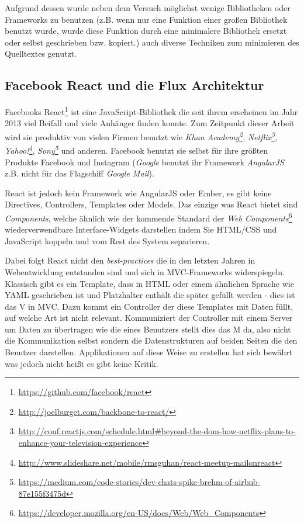 \documentclass[12pt,twoside]{book}
\begin{document}
Aufgrund dessen wurde neben dem Versuch möglichst wenige Bibliotheken oder Frameworks zu benutzen (z.B. wenn nur eine Funktion einer großen Bibliothek benutzt wurde, wurde diese Funktion durch eine minimalere Bibliothek ersetzt oder selbst geschrieben bzw. kopiert.) auch diverse Techniken zum minimieren des Quelltextes genutzt.



\subsection*{Facebook React und die Flux Architektur}

Facebooks React\footnote{\url{https://github.com/facebook/react}} ist eine JavaScript-Bibliothek die seit ihrem erscheinen im Jahr 2013 viel Beifall und viele Anhänger finden konnte. Zum Zeitpunkt dieser Arbeit wird sie produktiv von vielen Firmen benutzt wie \textit{Khan Academy\footnote{\url{http://joelburget.com/backbone-to-react/}}}, \textit{Netflix\footnote{\url{http://conf.reactjs.com/schedule.html\#beyond-the-dom-how-netflix-plans-to-enhance-your-television-experience}}}, \textit{Yahoo!\footnote{\url{http://www.slideshare.net/mobile/rmsguhan/react-meetup-mailonreact}}}, \textit{Sony\footnote{\url{https://medium.com/code-stories/dev-chats-spike-brehm-of-airbnb-87e155f3475d}}} und anderen. Facebook benutzt sie selbst für ihre größten Produkte Facebook und Instagram (\textit{Google} benutzt ihr Framework \textit{AngularJS} z.B. nicht für das Flagschiff \textit{Google Mail}).

React ist jedoch kein Framework wie AngularJS oder Ember, es gibt keine Directives, Controllers, Templates oder Models. Das einzige was React bietet sind \textit{Components}, welche ähnlich wie der kommende Standard der \textit{Web Components}\footnote{\url{https://developer.mozilla.org/en-US/docs/Web/Web_Components}} wiederverwendbare Interface-Widgets darstellen indem Sie HTML/CSS und JavaScript koppeln und vom Rest des System separieren.

Dabei folgt React nicht den \textit{best-practices} die in den letzten Jahren in Webentwicklung entstanden sind und sich in MVC-Frameworks widerspiegeln. Klassisch gibt es ein Template, dass in HTML oder einem ähnlichen Sprache wie YAML geschrieben ist und Platzhalter enthält die später gefüllt werden - dies ist das V in MVC.
Dazu kommt ein Controller der diese Templates mit Daten füllt, auf welche Art ist nicht relevant. Kommuniziert der Controller mit einem Server um Daten zu übertragen wie die eines Benutzers stellt dies das M da, also nicht die Kommunikation selbst sondern die Datenstrukturen auf beiden Seiten die den Benutzer darstellen.
Applikationen auf diese Weise zu erstellen hat sich bewährt was jedoch nicht heißt es gibt keine Kritik.
\end{document}
